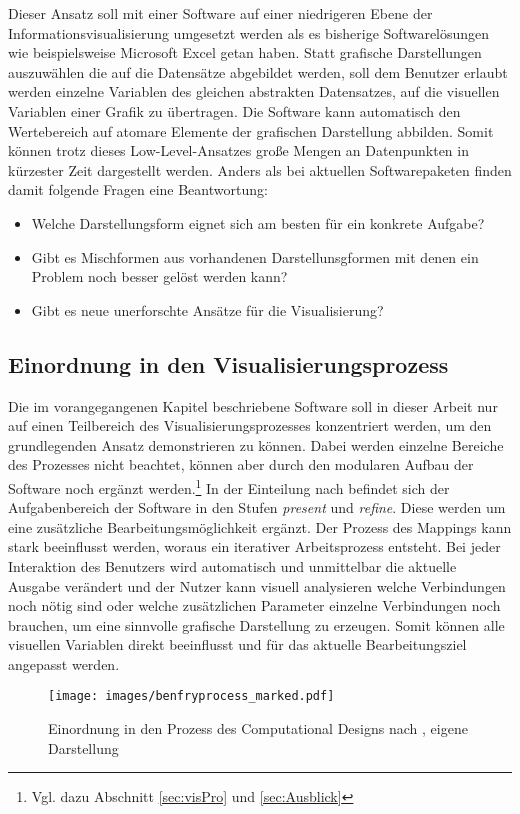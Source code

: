 \documentclass[a4paper, 12pt, DIVcalc, onepage, pdftex, headsepline, footsepline]{scrreprt}
\begin{document}
Dieser Ansatz soll mit einer Software auf einer niedrigeren Ebene der Informationsvisualisierung umgesetzt werden als
es bisherige Softwarelösungen wie beispielsweise Microsoft Excel getan haben. Statt grafische Darstellungen auszuwählen
die auf die Datensätze abgebildet werden, soll dem Benutzer erlaubt werden einzelne Variablen des gleichen abstrakten Datensatzes,
auf die visuellen Variablen einer Grafik zu übertragen. Die Software kann automatisch den Wertebereich auf atomare Elemente der
grafischen Darstellung abbilden. Somit können trotz dieses Low-Level-Ansatzes große Mengen an Datenpunkten
in kürzester Zeit dargestellt werden. Anders als bei aktuellen Softwarepaketen finden damit folgende Fragen
eine Beantwortung:
\begin{itemize}
\item Welche Darstellungsform eignet sich am besten für ein konkrete Aufgabe?
\item Gibt es Mischformen aus vorhandenen Darstellunsgformen mit denen ein Problem noch besser gelöst werden kann?
\item Gibt es neue unerforschte Ansätze für die Visualisierung?
\end{itemize}

\subsection{Einordnung in den Visualisierungsprozess}

Die im vorangegangenen Kapitel beschriebene Software soll in dieser Arbeit nur auf einen Teilbereich
des Visualisierungsprozesses konzentriert werden, um den grundlegenden Ansatz demonstrieren zu können. Dabei werden
einzelne Bereiche des Prozesses nicht beachtet, können aber durch den modularen Aufbau der Software
noch ergänzt werden.\footnote{Vgl. dazu Abschnitt \ref{sec:visPro} und \ref{sec:Ausblick}} In der
Einteilung nach \citep{BenFry} befindet sich der Aufgabenbereich der Software in den
Stufen \textit{present} und \textit{refine}. Diese werden um eine zusätzliche Bearbeitungsmöglichkeit ergänzt.
Der Prozess des Mappings kann stark beeinflusst werden, woraus ein iterativer Arbeitsprozess entsteht.
Bei jeder Interaktion des Benutzers wird automatisch und unmittelbar die
aktuelle Ausgabe verändert und der Nutzer kann visuell analysieren welche Verbindungen noch nötig sind
oder welche zusätzlichen Parameter einzelne Verbindungen noch brauchen, um eine sinnvolle grafische 
Darstellung zu erzeugen.
Somit können alle visuellen Variablen direkt beeinflusst und für das aktuelle Bearbeitungsziel angepasst
werden.
\begin{figure}
\centering
\texttt{[image: images/benfryprocess\_marked.pdf]}
\caption{Einordnung in den Prozess des Computational Designs nach \citep{BenFry}, eigene Darstellung}
\label{fig:benfryprocess_marked}
\end{figure}
\end{document}
